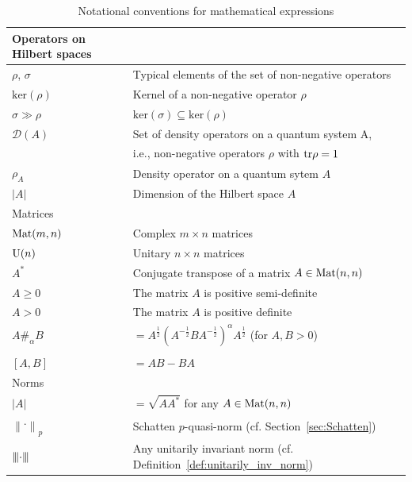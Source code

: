 \documentclass[11pt,a4paper,twoside]{report}
\newcommand{\+}{\textnormal{+} }
\def\tr{{\rm tr}}
\def\ker{{\text{ker}}}
\def\cD{\mathcal D}
\newcommand{\norm}[1]{\left\lVert#1\right\rVert}
\newcommand{\normT}[1]{\left\vert\kern-0.25ex\left\vert\kern-0.25ex\left\vert #1 
    \right\vert\kern-0.25ex\right\vert\kern-0.25ex\right\vert}
\theoremstyle{definition}
\numberwithin{equation}{chapter}
\begin{document}
\begin{appendix}
\begin{table}[!ht]
\renewcommand{\arraystretch}{1.3}
\caption{Notational conventions for mathematical expressions}
\label{TABsymbols}
\centering
\begin{tabular}{l l}
\hline
Operators on Hilbert spaces &\\ \hline
$\rho$, $\sigma$ & Typical elements of the set of non-negative operators\\
$\ker(\rho)$& Kernel of a non-negative operator $\rho$ \\
$\sigma \gg \rho$& $\ker( \sigma) \subseteq \ker(\rho)$ \\
$\cD(A)$& Set of density operators on a quantum system A, \\
&\quad i.e., non-negative operators $\rho$ with $\tr\rho=1$ \\
$\rho_A$& Density operator on a quantum sytem $A$ \\
$|A|$& Dimension of the Hilbert space $A$ \\ \hline
Matrices&\\ \hline
$\textnormal{Mat}(m,n)$ & Complex $m \times n$ matrices\\
$\textnormal{U}(n)$ & Unitary $n \times n$ matrices\\
$A^{*}$ & Conjugate transpose of a matrix $A \in \textnormal{Mat}(n,n)$ \\
$A\geqslant 0$&The matrix $A$ is positive semi-definite \\
$A> 0$&The matrix $A$ is positive definite \\
$A \#_{\alpha} B $&$= A^{\frac{1}{2}} \left(A^{-\frac{1}{2}}BA^{-\frac{1}{2}} \right)^{\alpha} A^{\frac{1}{2}}$ \quad (for $A,B>0$)\\
& \\
$[A,B] $&$=AB-BA$ \\ \hline
Norms&\\ \hline
$|A|$&$= \sqrt{AA^{*}}$  for any $A \in \textnormal{Mat}(n,n)$\\
$\norm{\cdot}_p$&Schatten $p$-quasi-norm (cf. Section~\ref{sec:Schatten}) \\
$\normT{\cdot}$&Any unitarily invariant norm (cf. Definition~\ref{def:unitarily_inv_norm}) \\
\hline
\end{tabular}
\end{table}










\end{appendix}
\end{document}
